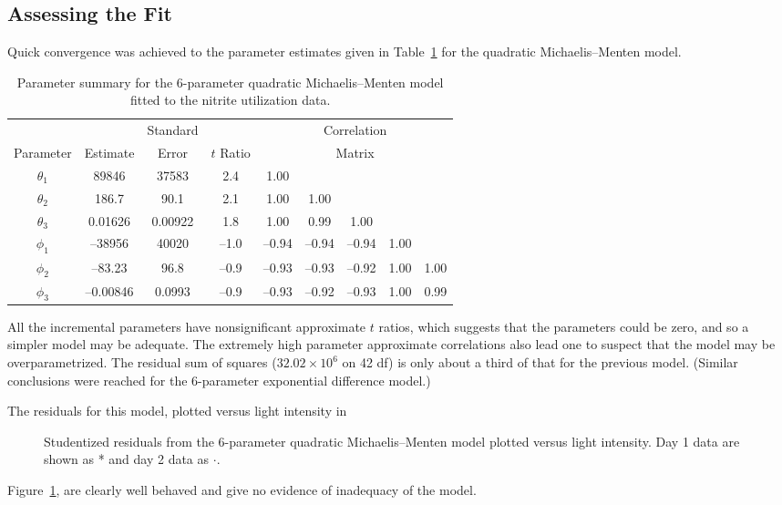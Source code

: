 \subsection{Assessing the Fit}

Quick convergence was achieved
to the parameter estimates given in
Table~\ref{tbl:3.5} for the quadratic Michaelis--Menten model.
\begin{table}
  \caption{
  Parameter summary for the 6-parameter quadratic Michaelis--Menten model
  fitted to the nitrite utilization data.}\label{tbl:3.5}
  \begin{center}
    \begin{tabular}{ccccccccc}\hline
      &&\multicolumn{1}{c}{Standard}&&\multicolumn{5}{c}{Correlation}\\
      \multicolumn{1}{c}{Parameter}&\multicolumn{1}{c}{Estimate}&
      \multicolumn{1}{c}{Error}& \multicolumn{1}{c}{$t$ Ratio} &
      \multicolumn{5}{c}{Matrix}\\ \hline
      $\theta_{1}$&89846&37583&2.4&1.00\\
      $\theta_{2}$&186.7&90.1&2.1&1.00&1.00\\
      $\theta_{3}$&0.01626&0.00922&1.8&1.00&0.99&1.00\\
      $\phi_{1}$&--38956&40020&--1.0&--\/0.94&--\/0.94&--\/0.94&1.00\\
      $\phi_{2}$&--83.23&96.8&--\/0.9&--\/0.93&--\/0.93&--\/0.92&1.00&1.00\\
      $\phi_{3}$&--\/0.00846&0.0993&--\/0.9&--\/0.93&--\/0.92&--\/0.93&1.00&0.99\\ \hline
    \end{tabular}
  \end{center}
\end{table}
All the incremental parameters have nonsignificant approximate
$t$ ratios, which suggests that the parameters could be zero, and
so a simpler model may be adequate.
The extremely high parameter approximate correlations also lead one to
suspect that the model may be overparametrized.
The residual sum of squares ($32.02 \times 10^{6}$ on 42 df)
is only about a third of that for the previous model.
(Similar conclusions were reached for the 6-parameter exponential
difference model.)

The residuals for this model, plotted versus light intensity in
\begin{figure}
  \vspace{3in}
  \caption{Studentized residuals from the 6-parameter quadratic
    Michaelis--Menten model plotted versus light intensity.  Day 1
    data are shown as * and day 2 data as $\cdot$.}
  \label{fig:NITres2}
\end{figure}
Figure~\ref{fig:NITres2}, are clearly well behaved and give no
evidence of inadequacy of the model.

